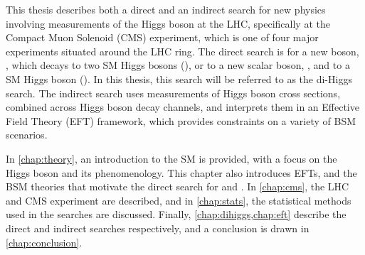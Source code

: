 This thesis describes both a direct and an indirect search for new physics involving measurements of the Higgs boson at the LHC, specifically at the Compact Muon Solenoid (CMS) experiment, which is one of four major experiments situated around the LHC ring. The direct search is for a new boson, \PX, which decays to two SM Higgs bosons (\XHH), or to a new scalar boson, \PY, and to a SM Higgs boson (\XYH). In this thesis, this search will be referred to as the di-Higgs search. The indirect search uses measurements of Higgs boson cross sections, combined across Higgs boson decay channels, and interprets them in an Effective Field Theory (EFT) framework, which provides constraints on a variety of BSM scenarios. 

In \cref{chap:theory}, an introduction to the SM is provided, with a focus on the Higgs boson and its phenomenology. This chapter also introduces EFTs, and the BSM theories that motivate the direct search for \XHH and \XYH. In \cref{chap:cms}, the LHC and CMS experiment are described, and in \cref{chap:stats}, the statistical methods used in the searches are discussed. Finally, \cref{chap:dihiggs,chap:eft} describe the direct and indirect searches respectively, and a conclusion is drawn in \cref{chap:conclusion}.